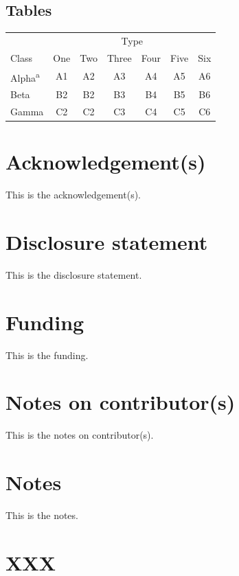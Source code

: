 \documentclass[]{interact}
\theoremstyle{plain}
\theoremstyle{definition}
\theoremstyle{remark}
\begin{document}
\subsection{Tables}
\begin{table}
  {\begin{tabular}{lcccccc} \toprule
                               & \multicolumn{6}{c}{Type}                                   \\ \cmidrule{2-7}
      Class                    & One                      & Two & Three & Four & Five & Six \\ \midrule
      Alpha\textsuperscript{a} & A1                       & A2  & A3    & A4   & A5   & A6  \\
      Beta                     & B2                       & B2  & B3    & B4   & B5   & B6  \\
      Gamma                    & C2                       & C2  & C3    & C4   & C5   & C6  \\ \bottomrule
    \end{tabular}}
  \label{sample-table}
\end{table}

\section*{Acknowledgement(s)}
This is the acknowledgement(s).

\section*{Disclosure statement}
This is the disclosure statement.

\section*{Funding}
This is the funding.

\section*{Notes on contributor(s)}
This is the notes on contributor(s).

\section*{Notes}
This is the notes.




\appendix
\section{XXX}
\end{document}
